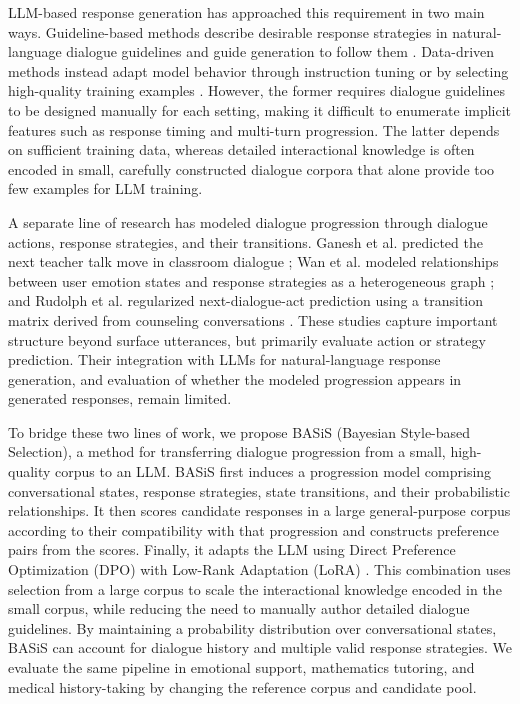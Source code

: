\documentclass[manuscript,review,anonymous]{acmart}
\begin{document}
LLM-based response generation has approached this requirement in two main ways. Guideline-based methods describe desirable response strategies in natural-language dialogue guidelines and guide generation to follow them \cite{gupta2023dialguide,wen2025guidedtod}. Data-driven methods instead adapt model behavior through instruction tuning or by selecting high-quality training examples \cite{zhou2023lima,zhang2025datasurvey}. However, the former requires dialogue guidelines to be designed manually for each setting, making it difficult to enumerate implicit features such as response timing and multi-turn progression. The latter depends on sufficient training data, whereas detailed interactional knowledge is often encoded in small, carefully constructed dialogue corpora that alone provide too few examples for LLM training.

A separate line of research has modeled dialogue progression through dialogue actions, response strategies, and their transitions. Ganesh et al. predicted the next teacher talk move in classroom dialogue \cite{ganesh2021teacher}; Wan et al. modeled relationships between user emotion states and response strategies as a heterogeneous graph \cite{wan2025emodynamix}; and Rudolph et al. regularized next-dialogue-act prediction using a transition matrix derived from counseling conversations \cite{rudolph2026transition}. These studies capture important structure beyond surface utterances, but primarily evaluate action or strategy prediction. Their integration with LLMs for natural-language response generation, and evaluation of whether the modeled progression appears in generated responses, remain limited.

To bridge these two lines of work, we propose BASiS (Bayesian Style-based Selection), a method for transferring dialogue progression from a small, high-quality corpus to an LLM. BASiS first induces a progression model comprising conversational states, response strategies, state transitions, and their probabilistic relationships. It then scores candidate responses in a large general-purpose corpus according to their compatibility with that progression and constructs preference pairs from the scores. Finally, it adapts the LLM using Direct Preference Optimization (DPO) \cite{rafailov2023dpo} with Low-Rank Adaptation (LoRA) \cite{hu2021lora}. This combination uses selection from a large corpus to scale the interactional knowledge encoded in the small corpus, while reducing the need to manually author detailed dialogue guidelines. By maintaining a probability distribution over conversational states, BASiS can account for dialogue history and multiple valid response strategies. We evaluate the same pipeline in emotional support, mathematics tutoring, and medical history-taking by changing the reference corpus and candidate pool.
\end{document}
